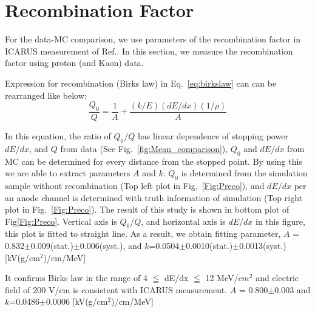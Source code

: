\section{Recombination Factor}

For the data-MC comparison, we use parameters of the recombination factor in ICARUS measurement of Ref.\cite{658352}.
In this section, we measure the recombination factor using proton (and Kaon) data.


  Expression for recombination (Birks law) in Eq.~\ref{eq:birkslaw} can can be rearranged like below:
\begin{equation}
  \frac{Q_{0}}{Q} = \frac{1}{A}+\frac{(k/E)(dE/dx)(1/\rho)}{A}
\end{equation}

In this equation, the ratio of $Q_{0}/Q$ has linear dependence of stopping power $dE/dx$,
and $Q$ from data (See Fig.~\ref{fig:Mean_comparison}), $Q_{0}$ and $dE/dx$ from MC can be determined for every distance from the stopped point.
By using this we are able to extract parameters $A$ and $k$.
$Q_{0}$ is determined from the simulation sample without recombination (Top left plot in Fig.~\ref{Fig:Preco}), and $dE/dx$ per an anode channel is determined with truth information of simulation (Top right plot in Fig.~\ref{Fig:Preco}). 
The result of this study is shown in bottom plot of Fig\ref{Fig:Preco}. Vertical axis is $Q_{0}/Q$, and horizontal axis is $dE/dx$ in this figure, this plot is fitted to straight line.
As a result, we obtain fitting parameter, $A$ = 0.832$\pm$0.009(stat.)$\pm$0.006(syst.), and $k$=0.0504$\pm$0.0010(stat.)$\pm$0.0013(syst.) [kV(g/cm$^{2}$)/cm/MeV]

It confirms Birks law in the range of 4  $\leqq$ dE/dx $\leqq$ 12 MeV/$cm^2$ and electric field of 200 V/cm is consistent with ICARUS measurement\cite{658352}.
 $A$ = 0.800$\pm$0.003 and $k$=0.0486$\pm$0.0006 [kV(g/cm$^{2}$)/cm/MeV]

